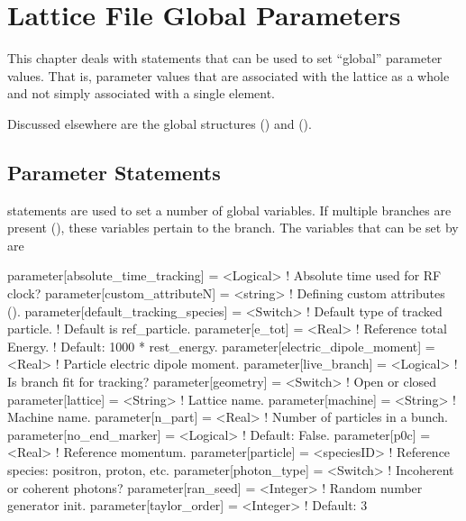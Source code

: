 \chapter{Lattice File Global Parameters}

This chapter deals with statements that can be used to set ``global'' parameter values. That is,
parameter values that are associated with the lattice as a whole and not simply associated with a
single element.

Discussed elsewhere are the global structures ()  
and  ().

\section{Parameter Statements}
\label{s:param}


 statements are used to set a number of global variables.  If multiple branches are
present (), these variables pertain to the  branch. The variables that
can be set by  are
\begin{example}
  parameter[absolute_time_tracking]   = <Logical>   ! Absolute time used for RF clock?
  parameter[custom_attributeN]        = <string>    ! Defining custom attributes ().
  parameter[default_tracking_species] = <Switch>    ! Default type of tracked particle. 
                                                    !    Default is ref_particle.
  parameter[e_tot]                    = <Real>      ! Reference total Energy. 
                                                    !      Default: 1000 * rest_energy.
  parameter[electric_dipole_moment]   = <Real>      ! Particle electric dipole moment.
  parameter[live_branch]              = <Logical>   ! Is branch fit for tracking?
  parameter[geometry]                 = <Switch>    ! Open or closed
  parameter[lattice]                  = <String>    ! Lattice name.
  parameter[machine]                  = <String>    ! Machine name.
  parameter[n_part]                   = <Real>      ! Number of particles in a bunch.
  parameter[no_end_marker]            = <Logical>   ! Default: False.
  parameter[p0c]                      = <Real>      ! Reference momentum.
  parameter[particle]                 = <speciesID> ! Reference species: positron, proton, etc.
  parameter[photon_type]              = <Switch>    ! Incoherent or coherent photons?
  parameter[ran_seed]                 = <Integer>   ! Random number generator init.
  parameter[taylor_order]             = <Integer>   ! Default: 3
\end{example}

